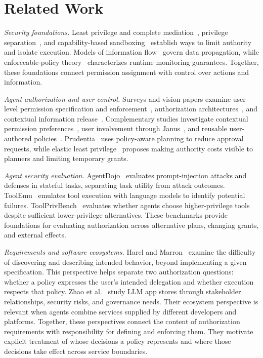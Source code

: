 \section{Related Work}
\emph{Security foundations.} Least privilege and complete mediation~\cite{saltzer}, privilege separation~\cite{privsep}, and capability-based sandboxing~\cite{capsicum} establish ways to limit authority and isolate execution. Models of information flow~\cite{denning} govern data propagation, while enforceable-policy theory~\cite{schneider} characterizes runtime monitoring guarantees. Together, these foundations connect permission assignment with control over actions and information.

\noindent\emph{Agent authorization and user control.} Surveys and vision papers examine user-level permission specification and enforcement~\cite{permissions}, authorization architectures~\cite{architectures}, and contextual information release~\cite{aac}. Complementary studies investigate contextual permission preferences~\cite{dataperms}, user involvement through Janus~\cite{janus}, and reusable user-authored policies~\cite{userpolicies}. Prudentia~\cite{prudentia} uses policy-aware planning to reduce approval requests, while elastic least privilege~\cite{elasticprivilege} proposes making authority costs visible to planners and limiting temporary grants.

\noindent\emph{Agent security evaluation.} AgentDojo~\cite{agentdojo} evaluates prompt-injection attacks and defenses in stateful tasks, separating task utility from attack outcomes. ToolEmu~\cite{toolemu} emulates tool execution with language models to identify potential failures. ToolPrivBench~\cite{toolprivbench} evaluates whether agents choose higher-privilege tools despite sufficient lower-privilege alternatives. These benchmarks provide foundations for evaluating authorization across alternative plans, changing grants, and external effects.

\noindent\emph{Requirements and software ecosystems.} Harel and Marron~\cite{requirements} examine the difficulty of discovering and describing intended behavior, beyond implementing a given specification. This perspective helps separate two authorization questions: whether a policy expresses the user's intended delegation and whether execution respects that policy. Zhao et al.~\cite{appstore} study LLM app stores through stakeholder relationships, security risks, and governance needs. Their ecosystem perspective is relevant when agents combine services supplied by different developers and platforms. Together, these perspectives connect the content of authorization requirements with responsibility for defining and enforcing them. They motivate explicit treatment of whose decisions a policy represents and where those decisions take effect across service boundaries.
